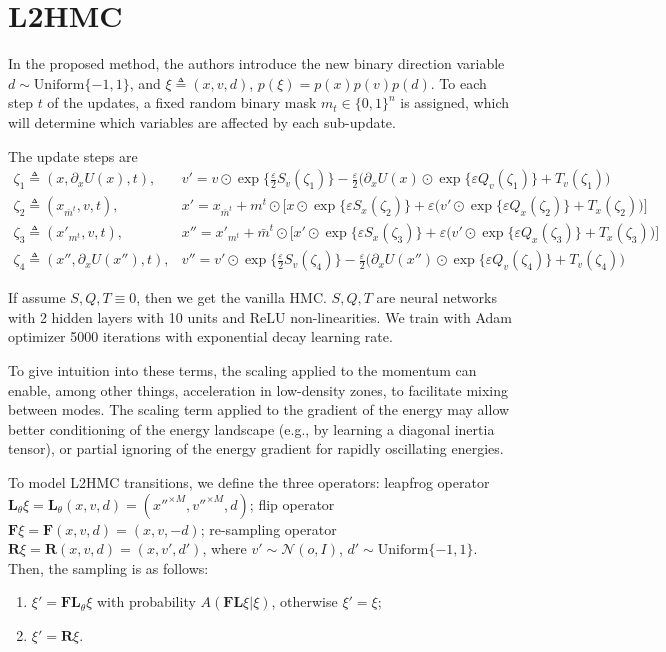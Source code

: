\documentclass{article}
\begin{document}
\section*{L2HMC}

In the proposed method, the authors introduce the new binary direction variable $d \sim \mathrm{Uniform}\{-1, 1\}$, and $\xi \triangleq (x, v, d)$, $p(\xi) = p(x)p(v)p(d)$. To each step $t$ of the updates, a fixed random binary mask $m_t \in \{0, 1\}^n$ is assigned, which will determine which variables are affected by each sub-update.

The update steps are
\begin{eqnarray*}
        \zeta_1 \triangleq (x, \partial_x U(x), t), & v' = v \odot \exp \big\{ \frac{\varepsilon}{2} S_v(\zeta_1) \big\} - \frac{\varepsilon}{2} \Big( \partial_x U(x) \odot \exp \big\{ \varepsilon Q_v(\zeta_1) \big\} + T_v(\zeta_1) \Big) \\
        \zeta_2 \triangleq (x_{\bar{m}^t}, v, t), & x' = x_{\bar{m}^t} + m^t \odot \Big[ x \odot \exp \big\{ \varepsilon S_x(\zeta_2) \big\} + \varepsilon \Big( v' \odot \exp \big\{ \varepsilon Q_x(\zeta_2) \big\} + T_x(\zeta_2) \Big) \Big] \\
        \zeta_3 \triangleq (x'_{m^t}, v, t), & x'' = x'_{m^t} + \bar{m}^t \odot \Big[ x' \odot \exp \big\{ \varepsilon S_x(\zeta_3) \big\} + \varepsilon \Big( v' \odot \exp \big\{ \varepsilon Q_x(\zeta_3) \big\} + T_x(\zeta_3) \Big) \Big] \\
        \zeta_4 \triangleq (x'', \partial_x U(x''), t), & v'' = v' \odot \exp \big\{ \frac{\varepsilon}{2} S_v(\zeta_4) \big\} - \frac{\varepsilon}{2} \Big( \partial_x U(x'') \odot \exp \big\{ \varepsilon Q_v(\zeta_4) \big\} + T_v(\zeta_4) \Big)
    \end{eqnarray*}
    
If assume $S, Q, T \equiv 0$, then we get the vanilla HMC. $S, Q, T$ are neural networks with 2 hidden layers with 10 units and ReLU non-linearities. We train with Adam optimizer 5000 iterations with exponential decay learning rate.

To give intuition into these terms, the scaling applied to the momentum can enable, among other things, acceleration in low-density zones, to facilitate mixing between modes. The scaling term applied to the gradient of the energy may allow better conditioning of the energy landscape (e.g., by learning a diagonal inertia tensor), or partial ignoring of the energy gradient for rapidly oscillating energies.

To model L2HMC transitions, we define the three operators: leapfrog operator $\mathbf{L}_{\theta}\xi = \mathbf{L}_{\theta}(x, v, d) = (x''^{\times M}, v''^{\times M}, d)$; flip operator $\mathbf{F}\xi = \mathbf{F}(x, v, d) = (x, v, -d)$; re-sampling operator $\mathbf{R}\xi = \mathbf{R}(x, v, d) = (x, v', d')$, where $v' \sim \mathcal{N}(o, I)$, $d' \sim \mathrm{Uniform}\{-1, 1\}$. Then, the sampling is as follows:
\begin{enumerate}
    \item $\xi' = \mathbf{FL}_{\theta}\xi$ with probability $A(\mathbf{FL}\xi | \xi)$, otherwise $\xi' = \xi$;
    \item $\xi' = \mathbf{R}\xi$.
\end{enumerate}
\end{document}
